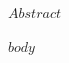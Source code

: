 \documentclass[mstat,12pt]{unswthesis}
\begin{document}



$Abstract$



\afterpreface





%
%






$body$
\end{document}
